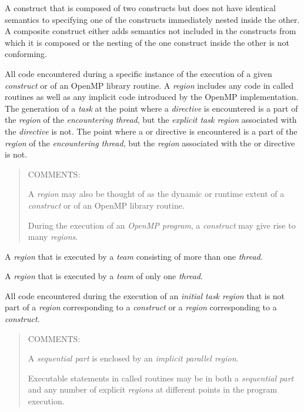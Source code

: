 \glossarydefstart 
A construct that is composed of two constructs but does not have identical semantics to specifying one of the constructs immediately nested inside the other. A composite construct either adds semantics not included in the constructs from which it is composed or the nesting of the one construct inside the other is not conforming.
\glossarydefend


\glossarydefstart
All code encountered during a specific instance of the execution of a given 
\emph{construct} or of an OpenMP library routine. A \emph{region} includes any code in called 
routines as well as any implicit code introduced by the OpenMP implementation. 
The generation of a \emph{task} at the point where a  \emph{directive} is encountered is a 
part of the \emph{region} of the \emph{encountering thread}, but the \emph{explicit task region}
associated with the  \emph{directive} is not. The point where a  or 
directive is encountered is a part of the \emph{region} of the \emph{encountering thread}, but the 
\emph{region} associated with the  or  directive is not.

\begin{quote}
COMMENTS:

A \emph{region} may also be thought of as the dynamic or runtime extent of a 
\emph{construct} or of an OpenMP library routine.

During the execution of an \emph{OpenMP program}, a \emph{construct} may give 
rise to many \emph{regions}.
\end{quote}
\glossarydefend

\glossarydefstart
A  \emph{region} that is executed by a \emph{team} consisting of more than one 
\emph{thread}.
\glossarydefend

\smallskip
{}
\glossarydefstart
A  \emph{region} that is executed by a \emph{team} of only one \emph{thread}.
\glossarydefend

\glossarydefstart
All code encountered during the execution of an \emph{initial task region} that is not part 
of a  \emph{region} corresponding to a  \emph{construct} or a 
\emph{region} corresponding to a  \emph{construct}.

\begin{quote}
COMMENTS: 

A \emph{sequential part} is enclosed by an \emph{implicit parallel region}.

Executable statements in called routines may be in both a \emph{sequential 
part} and any number of explicit  \emph{regions} at different points 
in the program execution.
\end{quote}
\glossarydefend

